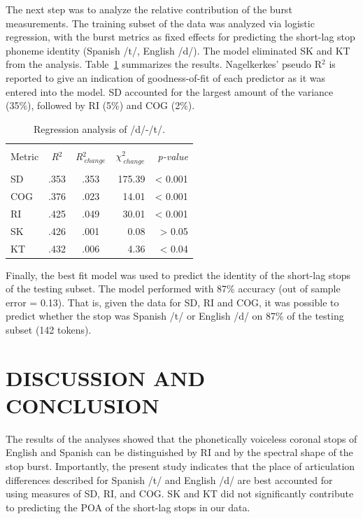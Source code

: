 \documentclass[a4paper,11pt,twocolumn]{article}
\begin{document}
The next step was to analyze the relative contribution of the burst measurements. The training subset of the data was analyzed via logistic regression, with the burst metrics as fixed effects for predicting the short-lag stop phoneme identity (Spanish /t/, English /d/). The model eliminated SK and KT from the analysis. Table~\ref{model_sum} summarizes the results. Nagelkerkes' pseudo R$^2$ is reported to give an indication of goodness-of-fit of each predictor as it was entered into the model. SD accounted for the largest amount of the variance (35\%), followed by RI (5\%) and COG (2\%).

\begin{table}[h]
\caption{Regression analysis of /d/-/t/.\label{model_sum}}
\begin{center}
\begin{tabular}{@{}lccrr@{}}
\hline \\ [-2ex]
Metric & \emph{R}$^2$ & \emph{R}$^2_{\ change}$ & \emph{$\chi^2_{\ change}$} & \emph{p-value} \\
\hline \\ [-2ex]
SD  & .353  & .353 & 175.39 & < 0.001 \\
COG & .376  & .023 &  14.01 & < 0.001 \\
RI  & .425  & .049 &  30.01 & < 0.001 \\
SK  & .426  & .001 &   0.08 & > 0.05  \\
KT  & .432  & .006 &   4.36 & < 0.04  \\
\hline
\end{tabular}
\end{center}
\end{table}

Finally, the best fit model was used to predict the identity of the short-lag stops of the testing subset. The model performed with 87\% accuracy (out of sample error = 0.13). That is, given the data for SD, RI and COG, it was possible to predict whether the stop was Spanish /t/ or English /d/ on 87\% of the testing subset (142 tokens).

\section{DISCUSSION AND CONCLUSION}

The results of the analyses showed that the phonetically voiceless coronal stops of English and Spanish can be distinguished by RI and by the spectral shape of the stop burst. Importantly, the present study indicates that the place of articulation differences described for Spanish /t/ and English /d/ are best accounted for using measures of SD, RI, and COG. SK and KT did not significantly contribute to predicting the POA of the short-lag stops in our data.
\end{document}
